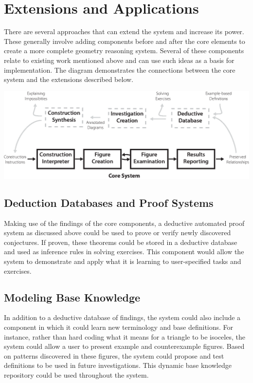 \documentclass[10pt]{article}
\begin{document}
\section{Extensions and Applications}

\label{sec:extension}
There are several approaches that can extend the system and increase
its power.  These generally involve adding components before and after
the core elements to create a more complete geometry reasoning system.
Several of these components relate to existing work mentioned above
and can use such ideas as a basis for implementation. The diagram
demonstrates the connections between the core system and the
extensions described below.

\begin{center}
\includegraphics[width=\textwidth]{diagrams/system-diagram.eps}
\end{center}


\subsection{Deduction Databases and Proof Systems}

Making use of the findings of the core components, a deductive
automated proof system as discussed above could be used to prove or
verify newly discovered conjectures.  If proven, these theorems could
be stored in a deductive database and used as inference rules in
solving exercises.  This component would allow the system to
demonstrate and apply what it is learning to user-specified tasks and
exercises.

\subsection{Modeling Base Knowledge}

In addition to a deductive database of findings, the system could also
include a component in which it could learn new terminology and base
definitions.  For instance, rather than hard coding what it means for
a triangle to be isoceles, the system could allow a user to present
example and counterexample figures.  Based on patterns discovered in
these figures, the system could propose and test definitions to be
used in future investigations.  This dynamic base knowledge repository
could be used throughout the system.
\end{document}
